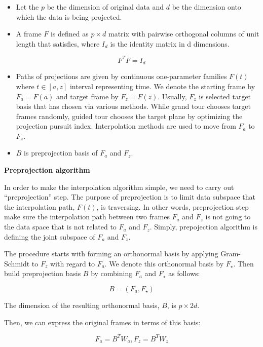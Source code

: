 \begin{itemize}
\item
  Let the \(p\) be the dimension of original data and \(d\) be the
  dimension onto which the data is being projected.
\item
  A frame \(F\) is defined as \(p\times d\) matrix with pairwise
  orthogonal columns of unit length that satisfies, where \(I_d\) is the
  identity matrix in d dimensions.
\end{itemize}

\[F^TF = I_d\]

\begin{itemize}
\item
  Paths of projections are given by continuous one-parameter families
  \(F(t)\) where \(t\in [a, z]\) interval representing time. We denote
  the starting frame by \(F_a = F(a)\) and target frame by
  \(F_z = F(z)\). Usually, \(F_z\) is selected target basis that has
  chosen via various methods. While grand tour chooses target frames
  randomly, guided tour chooses the target plane by optimizing the
  projection pursuit index. Interpolation methods are used to move from
  \(F_a\) to \(F_z\).
\item
  \(B\) is preprojection basis of \(F_a\) and \(F_z\).
\end{itemize}

\textbf{Preprojection algorithm}

In order to make the interpolation algorithm simple, we need to carry
out ``preprojection'' step. The purpose of preprojection is to limit
data subspace that the interpolation path, \(F(t)\), is traversing. In
other words, preprojection step make sure the interpolation path between
two frames \(F_a\) and \(F_z\) is not going to the data space that is
not related to \(F_a\) and \(F_z\). Simply, prepojection algorithm is
defining the joint subspace of \(F_a\) and \(F_z\).

The procedure starts with forming an orthonormal basis by applying
Gram-Schmidt to \(F_z\) with regard to \(F_a\). We denote this
orthonormal basis by \(F_\star\). Then build preprojection basis \(B\)
by combining \(F_a\) and \(F_\star\) as follows:

\[B = (F_a, F_{\star})\]

The dimension of the resulting orthonormal basis, \(B\), is
\(p\times 2d\).

Then, we can express the original frames in terms of this basis:

\[F_a = B^TW_a, F_z = B^TW_z\]

